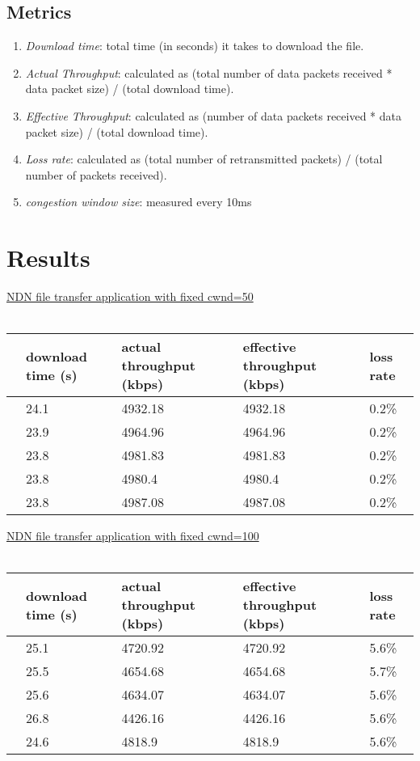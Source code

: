\documentclass[10pt]{article}
\begin{document}
\subsection{Metrics}
\begin{enumerate}
\item \emph{Download time}: total time (in seconds) it takes to download the file.
\item \emph{Actual Throughput}: calculated as (total number of data packets received *
  data packet size) / (total download time).
\item \emph{Effective Throughput}: calculated as (number of data packets received *
  data packet size) / (total download time).
\item \emph{Loss rate}: calculated as (total number of retransmitted packets) /
  (total number of packets received).
\item \emph{congestion window size}: measured every 10ms
\end{enumerate}

\section{Results}

\underline{NDN file transfer application with fixed cwnd=50}\\\\
\begin{tabular}{ | l | l | l | l | l |}
  \hline
  & download time (s) & actual throughput (kbps) & effective
  throughput (kbps) & loss rate \\\hline
  & 24.1 & 4932.18 & 4932.18 & 0.2\% \\\hline
  & 23.9 & 4964.96 & 4964.96 & 0.2\% \\\hline
  & 23.8 & 4981.83 & 4981.83 & 0.2\% \\\hline
  & 23.8 & 4980.4 & 4980.4 & 0.2\% \\\hline
  & 23.8 & 4987.08 & 4987.08 & 0.2\% \\\hline
\end{tabular}

\vspace{1em}
\underline{NDN file transfer application with fixed cwnd=100}\\\\
\begin{tabular}{ | l | l | l | l | l |}
  \hline
  & download time (s) & actual throughput (kbps) & effective
  throughput (kbps) & loss rate \\\hline
  & 25.1 & 4720.92 & 4720.92 & 5.6\% \\\hline
  & 25.5 & 4654.68 & 4654.68 & 5.7\% \\\hline
  & 25.6 & 4634.07 & 4634.07 & 5.6\% \\\hline
  & 26.8 & 4426.16 & 4426.16 & 5.6\% \\\hline
  & 24.6 & 4818.9 & 4818.9 & 5.6\% \\\hline
\end{tabular}
\end{document}
